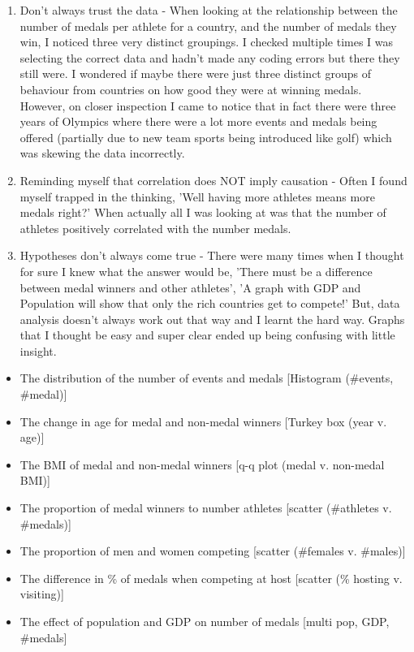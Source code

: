 \documentclass[a4 paper, 12pt]{article}
\begin{document}
        \begin{enumerate}
            \item Don't always trust the data - When looking at the relationship between the number of medals per athlete for a country, and the number of medals they win, I noticed three very distinct groupings. I checked multiple times I was selecting the correct data and hadn't made any coding errors but there they still were. I wondered if maybe there were just three distinct groups of behaviour from countries on how good they were at winning medals. However, on closer inspection I came to notice that in fact there were three years of Olympics where there were a lot more events and medals being offered (partially due to new team sports being introduced like golf) which was skewing the data incorrectly.
            \item Reminding myself that correlation does NOT imply causation - Often I found myself trapped in the thinking, 'Well having more athletes means more medals right?' When actually all I was looking at was that the number of athletes positively correlated with the number medals.
            \item Hypotheses don't always come true - There were many times when I thought for sure I knew what the answer would be, 'There must be a difference between medal winners and other athletes', 'A graph with GDP and Population will show that only the rich countries get to compete!' But, data analysis doesn't always work out that way and I learnt the hard way. Graphs that I thought be easy and super clear ended up being confusing with little insight.
        \end{enumerate}




    
        










    \begin{itemize}
        \item The distribution of the number of events and medals [Histogram (\#events, \#medal)]
        


        
        \item The change in age for medal and non-medal winners [Turkey box (year v. age)]
        \item The BMI of medal and non-medal winners [q-q plot (medal v. non-medal BMI)]
        \item The proportion of medal winners to number athletes [scatter (\#athletes v. \#medals)]
        \item The proportion of men and women competing [scatter (\#females v. \#males)]
        \item The difference in \% of medals when competing at host [scatter (\% hosting v. visiting)]
        \item The effect of population and GDP on number of medals [multi \- pop, GDP, \#medals]
    \end{itemize}
\end{document}
